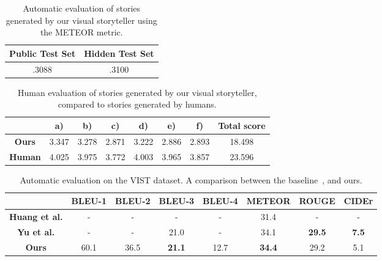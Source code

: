 \documentclass[11pt,a4paper]{article}
\begin{document}
 \begin{table}[h!]
    \begin{center}
      \begin{tabular}{ | c | c | }
        \hline
         \bf Public Test Set & \bf Hidden Test Set \\ \hline
         .3088 & .3100 \\ \hline
      \end{tabular}
      \caption{Automatic evaluation of stories generated by our visual storyteller using the METEOR metric.}
      \label{table:meteor}
    \end{center}
\end{table}

\begin{table*}[t]
    \begin{center}
      \begin{tabular}{| c | c | c | c | c | c | c | c |}
        \hline
         & \bf a) & \bf b) & \bf c) & \bf d) & \bf e) & \bf f) & \bf Total score \\ \hline
         \bf Ours & 3.347 & 3.278 & 2.871 & 3.222 & 2.886 & 2.893 & 18.498 \\ \hline
         \bf Human & 4.025 & 3.975 & 3.772 & 4.003 & 3.965 & 3.857 & 23.596 \\ \hline
      \end{tabular}
      \caption{Human evaluation of stories generated by our visual storyteller, compared to stories generated by humans.}
      \label{table:human}
    \end{center}
\end{table*}

\begin{table*}[t]
    \begin{center}
      \begin{tabular}{| c | c | c | c | c | c | c | c |}
        \hline
         & \bf BLEU-1 & \bf BLEU-2 & \bf BLEU-3 & \bf BLEU-4 & \bf METEOR & \bf ROUGE & \bf CIDEr  \\ \hline
         \bf Huang et al. & - & - & - & - & 31.4 & - & -\\ \hline
         \bf Yu et al. & - & - & 21.0 & - & 34.1 & \bf 29.5 & \bf 7.5\\ \hline
         \bf Ours & 60.1 & 36.5 & \bf 21.1 & 12.7 & \bf 34.4 & 29.2 & 5.1\\ \hline
      \end{tabular}
      \caption{Automatic evaluation on the VIST dataset. A comparison between the baseline~\cite{huang2016},  \cite{licheng} and ours.}
      \label{table:test}
    \end{center}
\end{table*}
\end{document}
